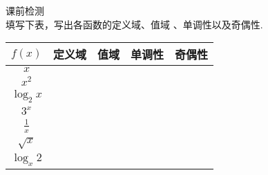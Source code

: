   \newtheorem*{Theorem}{定理}
  \makefront
\vspace{-1.5em}
\startexercise
\begin{exercise}{\heiti 课前检测}\\
  填写下表，写出各函数的定义域、值域 、单调性以及奇偶性.
  \begin{center}
    \renewcommand{\arraystretch}{1.4}
    \begin{tabular}{|c|c|c|c|c|}
      \hline
    $f(x)$&\mbox{\hspace{1.5em}定义域\hspace{1.5em}}&\mbox{\hspace{2em}值域\hspace{2em}}&\mbox{\hspace{8em}单调性\hspace{8em}}&\mbox{\hspace{1.2em}奇偶性\hspace{1.2em}}\\
      \hline
      $x$&&&&\\
      \hline
      $x^2$&&&&\\
      \hline
      $\log_2x$&&&&\\
      \hline
      $3^x$&&&&\\
      \hline
      $\tfrac{1}{x}$&&&&\\
      \hline
      $\sqrt{x}$&&&&\\
      \hline
      $\log_x2$&&&&\\
      \hline
    \end{tabular}\\
  \end{center}
\end{exercise}
